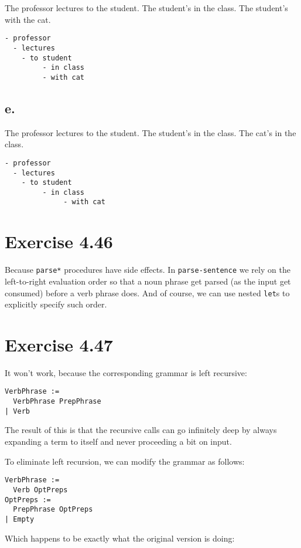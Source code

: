 \documentclass[../main.tex]{subfiles}
\begin{document}
The professor lectures to the student.
The student's in the class.
The student's with the cat.

\begin{lstlisting}
- professor
  - lectures
    - to student
         - in class
         - with cat
\end{lstlisting}

\subsection{e.}

The professor lectures to the student.
The student's in the class.
The cat's in the class.

\begin{lstlisting}
- professor
  - lectures
    - to student
         - in class
              - with cat
\end{lstlisting}

\section{Exercise 4.46}

Because \lstinline{parse*} procedures have side effects. In \lstinline{parse-sentence} we rely on the left-to-right evaluation order so that a noun phrase get parsed (as the input get consumed) before a verb phrase does. And of course, we can use nested \lstinline{let}s to explicitly specify such order.

\section{Exercise 4.47}

It won't work, because the corresponding grammar is left recursive:

\begin{lstlisting}
VerbPhrase :=
  VerbPhrase PrepPhrase
| Verb
\end{lstlisting}

The result of this is that the recursive calls can go infinitely deep by always expanding a term to itself and never proceeding a bit on input.

To eliminate left recursion, we can modify the grammar as follows:

\begin{lstlisting}
VerbPhrase :=
  Verb OptPreps
OptPreps :=
  PrepPhrase OptPreps
| Empty
\end{lstlisting}

Which happens to be exactly what the original version is doing:
\end{document}
